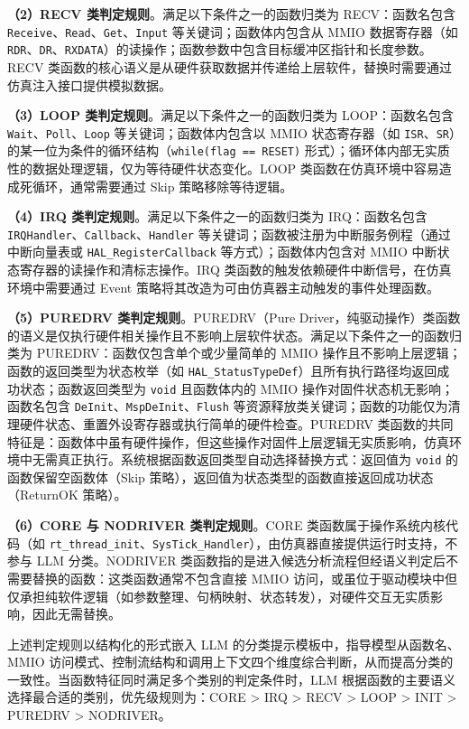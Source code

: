 \textbf{（2）RECV 类判定规则}。满足以下条件之一的函数归类为 RECV：函数名包含 \texttt{Receive}、\texttt{Read}、\texttt{Get}、\texttt{Input} 等关键词；函数体内包含从 MMIO 数据寄存器（如 \texttt{RDR}、\texttt{DR}、\texttt{RXDATA}）的读操作；函数参数中包含目标缓冲区指针和长度参数。RECV 类函数的核心语义是从硬件获取数据并传递给上层软件，替换时需要通过仿真注入接口提供模拟数据。

\textbf{（3）LOOP 类判定规则}。满足以下条件之一的函数归类为 LOOP：函数名包含 \texttt{Wait}、\texttt{Poll}、\texttt{Loop} 等关键词；函数体内包含以 MMIO 状态寄存器（如 \texttt{ISR}、\texttt{SR}）的某一位为条件的循环结构（\texttt{while(flag == RESET)} 形式）；循环体内部无实质性的数据处理逻辑，仅为等待硬件状态变化。LOOP 类函数在仿真环境中容易造成死循环，通常需要通过 Skip 策略移除等待逻辑。

\textbf{（4）IRQ 类判定规则}。满足以下条件之一的函数归类为 IRQ：函数名包含 \texttt{IRQHandler}、\texttt{Callback}、\texttt{Handler} 等关键词；函数被注册为中断服务例程（通过中断向量表或 \texttt{HAL\_RegisterCallback} 等方式）；函数体内包含对 MMIO 中断状态寄存器的读操作和清标志操作。IRQ 类函数的触发依赖硬件中断信号，在仿真环境中需要通过 Event 策略将其改造为可由仿真器主动触发的事件处理函数。

\textbf{（5）PUREDRV 类判定规则}。PUREDRV（Pure Driver，纯驱动操作）类函数的语义是仅执行硬件相关操作且不影响上层软件状态。满足以下条件之一的函数归类为 PUREDRV：函数仅包含单个或少量简单的 MMIO 操作且不影响上层逻辑；函数的返回类型为状态枚举（如 \texttt{HAL\_StatusTypeDef}）且所有执行路径均返回成功状态；函数返回类型为 \texttt{void} 且函数体内的 MMIO 操作对固件状态机无影响；函数名包含 \texttt{DeInit}、\texttt{MspDeInit}、\texttt{Flush} 等资源释放类关键词；函数的功能仅为清理硬件状态、重置外设寄存器或执行简单的硬件检查。PUREDRV 类函数的共同特征是：函数体中虽有硬件操作，但这些操作对固件上层逻辑无实质影响，仿真环境中无需真正执行。系统根据函数返回类型自动选择替换方式：返回值为 \texttt{void} 的函数保留空函数体（Skip 策略），返回值为状态类型的函数直接返回成功状态（ReturnOK 策略）。

\textbf{（6）CORE 与 NODRIVER 类判定规则}。CORE 类函数属于操作系统内核代码（如 \texttt{rt\_thread\_init}、\texttt{SysTick\_Handler}），由仿真器直接提供运行时支持，不参与 LLM 分类。NODRIVER 类函数指的是进入候选分析流程但经语义判定后不需要替换的函数：这类函数通常不包含直接 MMIO 访问，或虽位于驱动模块中但仅承担纯软件逻辑（如参数整理、句柄映射、状态转发），对硬件交互无实质影响，因此无需替换。

上述判定规则以结构化的形式嵌入 LLM 的分类提示模板中，指导模型从函数名、MMIO 访问模式、控制流结构和调用上下文四个维度综合判断，从而提高分类的一致性。当函数特征同时满足多个类别的判定条件时，LLM 根据函数的主要语义选择最合适的类别，优先级规则为：CORE > IRQ > RECV > LOOP > INIT > PUREDRV > NODRIVER。

